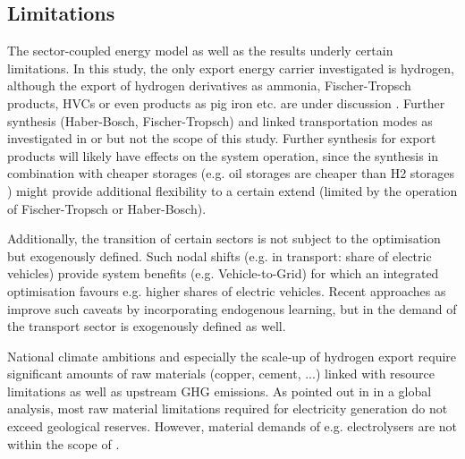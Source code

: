 \subsection{Limitations}
\label{subsec:limitations}

The sector-coupled energy model as well as the results underly certain limitations. In this study, the only export energy carrier investigated is hydrogen, although the export of hydrogen derivatives as ammonia, Fischer-Tropsch products, HVCs or even products as pig iron etc. are under discussion \cite{Verpoort2023}. Further synthesis (Haber-Bosch, Fischer-Tropsch) and linked transportation modes as investigated in \cite{Hampp2021} or \cite{Galimova2023} but not the scope of this study. Further synthesis for export products will likely have effects on the system operation, since the synthesis in combination with cheaper storages (e.g. oil storages are cheaper than H2 storages \cite{DEA2019TechnologyData}) might provide additional flexibility to a certain extend (limited by the operation of Fischer-Tropsch or Haber-Bosch).

Additionally, the transition of certain sectors is not subject to the optimisation but exogenously defined. Such nodal shifts (e.g. in transport: share of electric vehicles) provide system benefits (e.g. Vehicle-to-Grid) for which an integrated optimisation favours e.g. higher shares of electric vehicles.
Recent approaches as \cite{Zeyen2023} improve such caveats by incorporating endogenous learning, but in \cite{Zeyen2023} the demand of the transport sector is exogenously defined as well.

National climate ambitions and especially the scale-up of hydrogen export require significant amounts of raw materials (copper, cement, ...) linked with resource limitations as well as upstream GHG emissions. As pointed out in \cite{Wang2023} in a global analysis, most raw material limitations required for electricity generation do not exceed geological reserves. However, material demands of e.g. electrolysers are not within the scope of \cite{Wang2023}.


